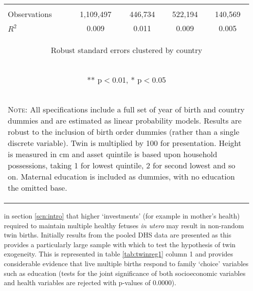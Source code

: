 \documentclass{article}[11pt,subeqn]
\begin{document}
\begin{spacing}{1.5}
\begin{table}[htpb!]
\begin{center}
\begin{tabular}{lcccc}
\vspace{4pt} & \begin{footnotesize}\end{footnotesize} & \begin{footnotesize}\end{footnotesize} & \begin{footnotesize}\end{footnotesize} & \begin{footnotesize}\end{footnotesize} \\
Observations & 1,109,497 & 446,734 & 522,194 & 140,569 \\
 $R^2$ & 0.009 & 0.011 & 0.009 & 0.005 \\ \midrule
\multicolumn{5}{c}{\begin{footnotesize} Robust standard errors clustered by country \end{footnotesize}} \\
\multicolumn{5}{c}{\begin{footnotesize} ** p$<$0.01, * p$<$0.05 \end{footnotesize}} \\
\bottomrule
\multicolumn{5}{p{10cm}}{\setstretch{0.9}\begin{footnotesize}\textsc{Note:} All specifications include a full set of year of birth and country
dummies and are estimated as linear probability models.  Results are robust to the inclusion of birth order dummies (rather than a single discrete 
variable).  Twin is multiplied by 100 for presentation.  Height is measured in cm and asset quintile is based upon household possessions, taking 1 
for lowest quintile, 2 for second lowest and so on.  Maternal education is included as dummies, with no education the omitted base.\end{footnotesize}}\\
\end{tabular}
\end{center}
\end{table}

\noindent in section \ref{scn:intro}
that higher `investments' (for example in mother's health) required to maintain multiple healthy fetuses \emph{in utero} may result in 
non-random twin births. Initially results from the pooled DHS data are presented as this provides a particularly large sample with which to test the hypothesis of
twin exogeneity.  This is represented in table \ref{tab:twinreg1} column 1 and provides considerable evidence that live multiple
births respond to family `choice' variables such as education (tests for the joint significance of both socioeconomic variables and health
variables are rejected with p-values of 0.0000).


\end{spacing}
\end{document}
